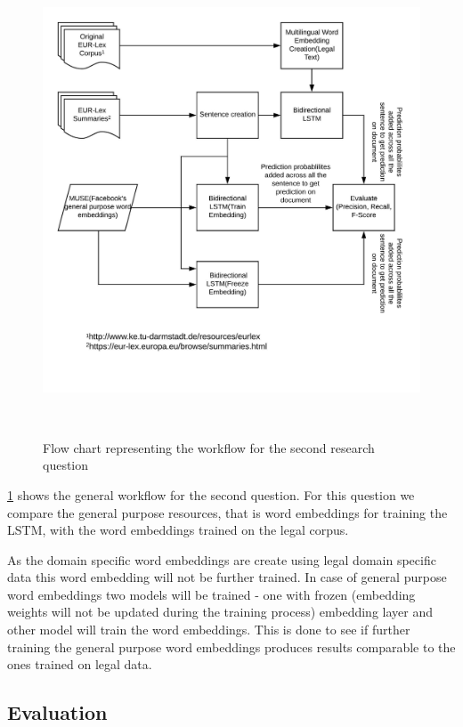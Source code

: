 \begin{figure}[!ht]
    \centering
    \includegraphics[width=15cm, height=14cm,keepaspectratio]{pics/flowforQuestion2.jpeg}
    \caption{Flow chart representing the workflow for the second research question}
    \label{fig:FlowResearchQuestion2}
\end{figure}

\ref{fig:FlowResearchQuestion2} shows the general workflow for the second question. For this question we compare the general purpose resources, that is word embeddings for training the LSTM, with the word embeddings trained on the legal corpus. 

As the domain specific word embeddings are create using legal domain specific data this word embedding will not be further trained. In case of general purpose word embeddings two models will be trained - one with frozen (embedding weights will not be updated during the training process) embedding layer and other model will train the word embeddings. This is done to see if further training the general purpose word embeddings produces results comparable to the ones trained on legal data.

\subsection*{Evaluation}

